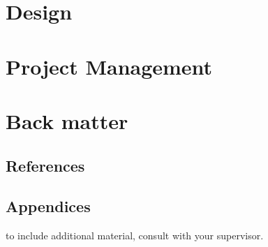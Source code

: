 \documentclass[11pt]{article}
\begin{document}
\newpage
\section{Design}


\newpage
\section{Project Management}


\newpage
\appendix
\section{Back matter}
\subsection{References}
\printbibliography

\subsection{Appendices}
to include additional material, consult with your supervisor.
\end{document}
